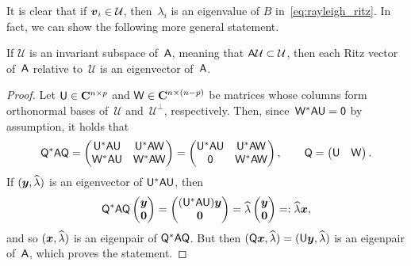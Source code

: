 It is clear that if $\mathbf{\boldsymbol{v}}_i \in \mathcal U$,
then~$\lambda_i$ is an eigenvalue of $B$ in~\eqref{eq:rayleigh_ritz}.
In fact,
we can show the following more general statement.
\begin{proposition}
    If $\mathcal U$ is an invariant subspace of~$\mathsf A$,
    meaning that $\mathsf A \mathcal U \subset \mathcal U$,
    then each Ritz vector of~$\mathsf A$ relative to~$\mathcal U$ is an eigenvector of~$\mathsf A$.
\end{proposition}
\begin{proof}
    Let $\mathsf U \in \mathbf C^{n \times p}$ and $\mathsf W \in \mathbf C^{n \times (n-p)}$ be matrices whose columns form orthonormal bases of~$\mathcal U$ and~$\mathcal U^\perp$,
    respectively.
    Then, since~$\mathsf W^* \mathsf A \mathsf U = \mathsf 0$ by assumption,
    it holds that
    \[
        \mathsf Q^* \mathsf A \mathsf Q =
        \begin{pmatrix}
            \mathsf U^* \mathsf A \mathsf U & \mathsf U^* \mathsf A \mathsf W \\
            \mathsf W^* \mathsf A \mathsf U & \mathsf W^* \mathsf A \mathsf W
        \end{pmatrix}
        =
        \begin{pmatrix}
            \mathsf U^* \mathsf A \mathsf U & \mathsf U^* \mathsf A \mathsf W \\
             \mathsf 0 & \mathsf W^* \mathsf A \mathsf W
        \end{pmatrix},
        \qquad
        \mathsf Q = \begin{pmatrix} \mathsf U & \mathsf W \end{pmatrix}.
    \]
    If $(\mathbf{\boldsymbol{y}}, \widehat \lambda)$ is an eigenvector of $\mathsf U^* \mathsf A \mathsf U$,
    then
    \[
        \mathsf Q^* \mathsf A \mathsf Q
        \begin{pmatrix}
            \mathbf{\boldsymbol{y}} \\
            \mathbf{\boldsymbol{0}}
        \end{pmatrix}
        =
        \begin{pmatrix}
            (\mathsf U^* \mathsf A \mathsf U) \mathbf{\boldsymbol{y}} \\
            \mathbf{\boldsymbol{0}}
        \end{pmatrix}
        =
        \widehat \lambda
        \begin{pmatrix}
            \mathbf{\boldsymbol{y}} \\
            \mathbf{\boldsymbol{0}}
        \end{pmatrix}
        =:
        \widehat \lambda \mathbf{\boldsymbol{x}},
    \]
    and so $(\mathbf{\boldsymbol{x}}, \widehat \lambda)$ is an eigenpair of $\mathsf Q^* \mathsf A \mathsf Q$.
    But then $(\mathsf Q \mathbf{\boldsymbol{x}}, \widehat \lambda) = (\mathsf U \mathbf{\boldsymbol{y}}, \widehat \lambda)$ is an eigenpair of~$\mathsf A$,
    which proves the statement.
\end{proof}


